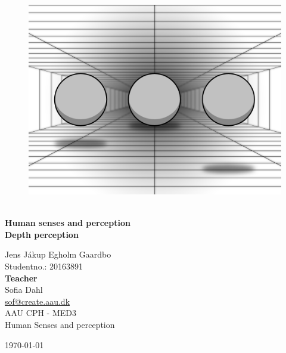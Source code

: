 \begin{titlepage}
			
\addtolength{\voffset}{2cm}

\begin{figure}[H]
\centering
\vspace{2cm}	%
\includegraphics[width=1\linewidth]{figure/Frontpage/frontpage2.png}
\end{figure}

\mbox{}
\vfill
\renewcommand{\familydefault}{\sfdefault} \normalfont %
\HRule\\[0.2cm]
\textbf{{\small Human senses and perception\\ \Huge Depth perception}}\\
\HRule\medskip{}
\begin{multicols}{2}
{\Large Jens Jákup Egholm Gaardbo\\
	Studentno.: 20163891
	\columnbreak}\\
\setlength{\parskip}{2.4cm}
\Large{\textbf{Teacher}\\Sofia Dahl\\\href{mailto:sof@create.aau.dk}{sof@create.aau.dk}}
\\\small AAU CPH - 
MED3 \\
Human Senses and perception\\
\end{multicols}
\today
\renewcommand{\familydefault}{\rmdefault} \normalfont %
\end{titlepage}


